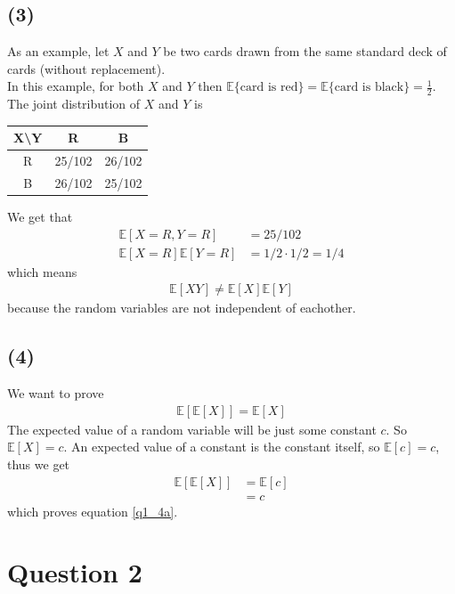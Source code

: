 \documentclass[a4paper]{article}
\begin{document}
\subsection*{(3)}
As an example, let $X$ and $Y$ be two cards drawn from the same standard deck of cards (without replacement).\\
In this example, for both $X$ and $Y$ then $\mathbb{E}\{\mbox{card is red}\}=\mathbb{E}\{\mbox{card is black}\}=\frac{1}{2}$.\\
The joint distribution of $X$ and $Y$ is
\begin{center}
\begin{tabular}{c||c|c}
X\textbackslash Y & R & B \\
\hline
\hline
R & 25/102  & 26/102 \\
\hline
B & 26/102 & 25/102 \\
\end{tabular}
\end{center}
We get that
\begin{align*}
\mathbb{E}[X=R,Y=R]&=25/102 \\
\mathbb{E}[X=R]\mathbb{E}[Y=R]&=1/2\cdot 1/2 = 1/4
\end{align*}
which means
\begin{align*}
\mathbb{E}[XY]\neq \mathbb{E}[X]\mathbb{E}[Y]
\end{align*}
because the random variables are not independent of eachother.

\subsection*{(4)}
We want to prove
\begin{align}
\mathbb{E}[\mathbb{E}[X]]=\mathbb{E}[X]
\label{q1_4a}
\end{align}
The expected value of a random variable will be just some constant $c$. So $\mathbb{E}[X]=c$. An expected value of a constant is the constant itself, so $\mathbb{E}[c]=c$, thus we get
\begin{align*}
\mathbb{E}[\mathbb{E}[X]]&=\mathbb{E}[c] \\
&= c
\end{align*}
which proves equation \ref{q1_4a}.

\newpage
\section*{Question 2}
\end{document}
